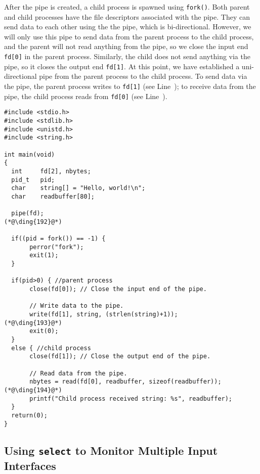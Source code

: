 After the pipe is created, a child process is spawned using \texttt{fork()}. 
Both parent and child processes have the
file descriptors associated with the pipe. They can send data to each other using the 
the pipe, which is bi-directional. However, we will only use this pipe to send data from the
parent process to the child process, and the parent will not read anything from the pipe, so 
we close the input end \texttt{fd[0]} in the parent process. Similarly, the child does not
send anything via the pipe, so it closes the output end \texttt{fd[1]}.  
At this point, we have established a uni-directional pipe from the parent process to the child process. 
To send data via the pipe, the parent process writes to \texttt{fd[1]} (see Line~);
to receive data from the pipe, the child process reads from \texttt{fd[0]} (see
Line~).  



\begin{lstlisting}
#include <stdio.h>
#include <stdlib.h>
#include <unistd.h>
#include <string.h>

int main(void)
{
  int     fd[2], nbytes;
  pid_t   pid;
  char    string[] = "Hello, world!\n";
  char    readbuffer[80];

  pipe(fd);                                                  (*@\ding{192}@*)
        
  if((pid = fork()) == -1) {
       perror("fork");
       exit(1);
  }

  if(pid>0) { //parent process 
       close(fd[0]); // Close the input end of the pipe. 

       // Write data to the pipe.
       write(fd[1], string, (strlen(string)+1));             (*@\ding{193}@*)
       exit(0);
  }
  else { //child process
       close(fd[1]); // Close the output end of the pipe.

       // Read data from the pipe.
       nbytes = read(fd[0], readbuffer, sizeof(readbuffer)); (*@\ding{194}@*)
       printf("Child process received string: %s", readbuffer);
  }
  return(0);
}
\end{lstlisting}
 



\subsection{Using \texttt{select} to Monitor Multiple Input Interfaces}
\label{vpn:subsec:select}

